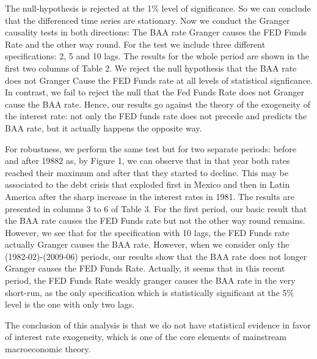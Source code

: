 \documentclass[
]{article}
\begin{document}
The null-hypothesis is rejected at the 1\% level of significance. So we
can conclude that the differenced time series are stationary. Now we
conduct the Granger causality tests in both directions: The BAA rate
Granger causes the FED Funds Rate and the other way round. For the test
we include three different specifications: 2, 5 and 10 lags. The results
for the whole period are shown in the first two columns of Table 2. We
reject the null hypothesis that the BAA rate does not Granger Cause the
FED Funds rate at all levels of statistical signficance. In contrast, we
fail to reject the null that the Fed Funds Rate does not Granger cause
the BAA rate. Hence, our results go against the theory of the exogeneity
of the interest rate: not only the FED funds rate does not precede and
predicts the BAA rate, but it actually happens the opposite way.

For robustness, we perform the same test but for two separate periods:
before and after 19882 as, by Figure 1, we can observe that in that year
both rates reached their maximum and after that they started to decline.
This may be associated to the debt crisis that exploded first in Mexico
and then in Latin America after the sharp increase in the interest rates
in 1981. The results are presented in columns 3 to 6 of Table 3. For the
first period, our basic result that the BAA rate causes the FED Funds
rate but not the other way round remains. However, we see that for the
specification with 10 lags, the FED Funds rate actually Granger causes
the BAA rate. However, when we consider only the (1982-02)-(2009-06)
periods, our results show that the BAA rate does not longer Granger
causes the FED Funds Rate. Actually, it seems that in this recent
period, the FED Funds Rate weakly granger causes the BAA rate in the
very short-run, as the only specification which is statistically
significant at the 5\% level is the one with only two lags.

The conclusion of this analysis is that we do not have statistical
evidence in favor of interest rate exogeneity, which is one of the core
elements of mainstream macroeconomic theory.
\end{document}
